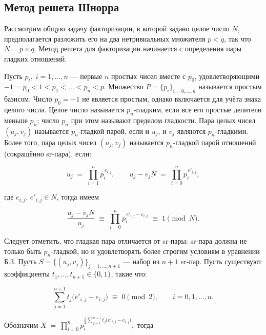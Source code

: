 
\subsection*{Метод решета Шнорра}

Рассмотрим общую задачу факторизации, в которой задано целое число $N$,
предполагается разложить его на два нетривиальных множителя $p<q$, так что $N =
p\times q$. Метод решета для факторизации начинается с определения пары гладких
отношений.

Пусть $p_i,\; i = 1,\dots,n$ — первые $n$ простых чисел вместе с $p_0$,
удовлетворяющими $-1 = p_0 < 1 < p_1 < \dots < p_n < p$. Множество $P =
\{p_i\}_{i=0,\dots,n}$ называется простым базисом. Число $p_0 = -1$ не является
простым, однако включается для учёта знака целого числа. Целое число называется
$p_n$‑гладким, если все его простые делители меньше $p_n$; число $p_n$ при этом
называют пределом гладкости. Пара целых чисел $(u_j,v_j)$ называется
$p_n$‑гладкой парой, если и $u_j$, и $v_j$ являются $p_n$‑гладкими. Более того,
пара целых чисел $(u_j,v_j)$ называется $p_n$‑гладкой парой отношений
(сокращённо sr‑пара), если:

\begin{equation}
  u_{j} \;=\; \prod_{i=1}^{n} p_{i}^{\,e_{i,j}},
  \qquad
  u_{j} - v_{j}N \;=\; \prod_{i=0}^{n} p_{i}^{\,e'_{i,j}},
\end{equation}

\noindent где $e_{i,j},\,e'_{i,j}\in{N}$, тогда имеем

\begin{equation}
  \frac{u_{j}-v_{j}N}{u_{j}}
  \;\equiv\;
  \prod_{i=0}^{n} p_{i}^{\,e'_{i,j}-e_{i,j}}
  \;\equiv\; 1 \pmod{N}.
\end{equation}

Следует отметить, что гладкая пара отличается от sr‑пары: sr‑пара должна не
только быть $p_n$‑гладкой, но и удовлетворять более строгим условиям в
уравнении Б.3. Пусть $S=\{(u_j,v_j)\}_{j=1,\dots,n+1}$ — набор из $n\!+\!1$
sr‑пар. Пусть существуют коэффициенты $ t_1,\dots,t_{n+1}\in\{0,1\}$, такие что:

\begin{equation}
  \sum_{j=1}^{n+1} t_{j}\bigl(e'_{i,j}-e_{i,j}\bigr)
  \;\equiv\; 0 \pmod{2},
  \qquad i = 0,1,\dots,n.
\end{equation}

\noindent Обозначим $X \;=\ \prod_{i=0}^{n}p_{i}^{\frac12 \sum_{j=1}^{n+1} t_{j}\bigl(e'_{i,j}-e_{i,j}\bigr)},$
тогда


